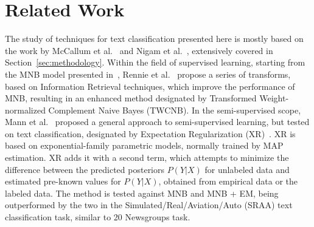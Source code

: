 \section{Related Work}
\label{sec:rel-work}

The study of techniques for text classification presented here is mostly 
based on the work by McCallum et al.~\cite{McCallum98acomparison} and 
Nigam et al.~\cite{Nigam2000}, extensively covered 
in Section~\ref{sec:methodology}. Within the field of supervised 
learning, starting from the MNB model presented 
in~\cite{McCallum98acomparison}, Rennie et al.~\cite{Rennie03tacklingthe} 
propose a series of transforms, based on Information Retrieval 
techniques, which improve the performance of MNB, resulting 
in an enhanced method designated by Transformed Weight-normalized Complement 
Naive Bayes (TWCNB). In the semi-supervised scope, Mann et al.~\cite{Mann2007a} 
proposed a general approach to semi-supervised learning, but tested on 
text classification, designated by Expectation 
Regularization (XR)~\cite{Mann2007a}. XR is based on exponential-family 
parametric models, normally trained by MAP estimation. XR adds it with a second 
term, which attempts to minimize the difference between 
the predicted posteriors $P(Y|X)$ for unlabeled data and estimated pre-known 
values for $P(Y|X)$, obtained from empirical 
data or the labeled data. The method is tested against MNB and MNB + EM, being 
outperformed by the two in the Simulated\slash Real\slash Aviation\slash Auto 
(SRAA) text classification task, similar to 20 Newsgroups task.\vertbreak
